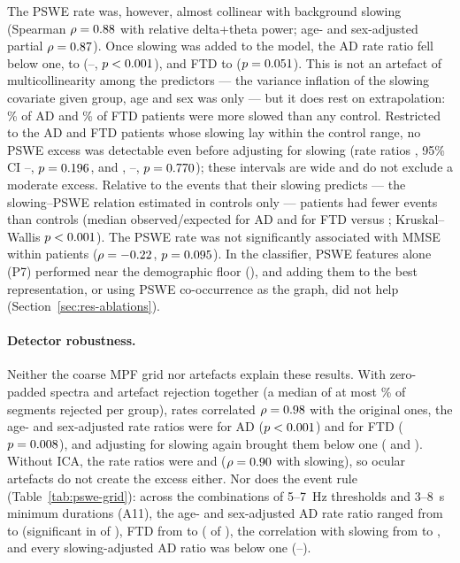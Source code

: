 The PSWE rate was, however, almost collinear with background slowing (Spearman $\rho=0.88$
with relative delta+theta power; age- and sex-adjusted partial $\rho=0.87$). Once slowing
was added to the model, the AD rate ratio fell below one, to \psweAdjSlowADRR{}
(\psweAdjSlowADLo{}--\psweAdjSlowADHi{}, $p<0.001$), and FTD to \psweAdjSlowFTDRR{}
($p=0.051$). This is not an artefact of multicollinearity among the predictors --- the
variance inflation of the slowing covariate given group, age and sex was only \colVif{} --- but it does
rest on extrapolation: \colADOutside\% of AD and \colFTDOutside\% of FTD patients were more slowed than
any control. Restricted to the \colADInSupport{} AD and \colFTDInSupport{} FTD patients whose slowing lay
within the control range, no PSWE excess was detectable even before adjusting for slowing (rate ratios
\colSupADRR{}, 95\% CI \csADLo{}--\csADHi{}, $p=0.196$, and \colSupFTDRR{}, \csFTDLo{}--\csFTDHi{},
$p=0.770$); these intervals are wide and do not exclude a moderate excess. Relative to the events that their
slowing predicts --- the slowing--PSWE relation estimated in controls only --- patients had fewer events
than controls (median observed/expected \colOeAD{} for AD and \colOeFTD{} for FTD versus \colOeCN{};
Kruskal--Wallis $p<0.001$). The PSWE rate was not
significantly associated with MMSE within patients ($\rho=-0.22$, $p=0.095$). In the
classifier, PSWE features alone (P7) performed near the demographic floor (\repPSeven{}), and adding
them to the best representation, or using PSWE co-occurrence as the graph, did not help
(Section~\ref{sec:res-ablations}).

\paragraph{Detector robustness.} Neither the coarse MPF grid nor artefacts explain these results. With
zero-padded spectra and artefact rejection together (a median of at most \psweRobRejectPct\% of segments
rejected per group), rates correlated $\rho=0.98$ with the original ones, the age- and sex-adjusted
rate ratios were \psweRobAdjADRR{} for AD ($p<0.001$) and \psweRobAdjFTDRR{} for FTD
($p=0.008$), and adjusting for slowing again brought them below one (\psweRobAdjSlowADRR{} and
\psweRobAdjSlowFTDRR{}). Without ICA, the rate ratios were \noIcaPsweADRR{} and \noIcaPsweFTDRR{}
($\rho=0.90$ with slowing), so ocular artefacts do not create the excess either. Nor does
the event rule (Table~\ref{tab:pswe-grid}): across the \gridN{} combinations of 5--\SI{7}{\hertz}
thresholds and 3--\SI{8}{\second} minimum durations (A11), the age- and sex-adjusted AD rate ratio ranged
from \gridADRrMin{} to \gridADRrMax{} (significant in \gridADNSig{} of \gridN{}), FTD from \gridFTDRrMin{} to
\gridFTDRrMax{} (\gridFTDNSig{} of \gridN{}), the correlation with slowing from \gridRhoMin{} to \gridRhoMax{},
and every slowing-adjusted AD ratio was below one (\gridADSlowMin{}--\gridADSlowMax{}).

